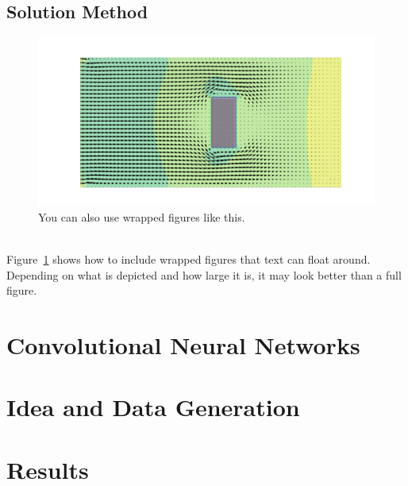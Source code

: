 \documentclass[11pt,table]{article}
\begin{document}
\subsection{Solution Method}
\lipsum[3-4]
\begin{figure}
	\centering
	\includegraphics[scale=1.0]{Figures/example_cover.png}
	\caption{You can also use wrapped figures like this.}
	\label{fig:wrapfigure_example}
\end{figure}
\lipsum[5] \\ \newline
Figure~\ref{fig:wrapfigure_example} shows how to include wrapped figures that text can float around. Depending on what is depicted and how large it is, it may look better than a full figure.

\section{Convolutional Neural Networks}

\lipsum

\section{Idea and Data Generation}

\lipsum

\section{Results}

\lipsum
\end{document}
